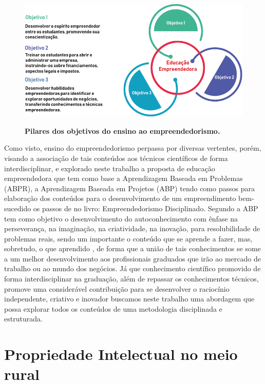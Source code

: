 \begin{figure}[!htb]
\centering
\caption{\textbf{Pilares dos objetivos do ensino ao empreendedorismo.}}
\includegraphics[scale=0.8]{Imagens/figura2.png}
\label{figura_3}
\end{figure}


Como visto, ensino do empreendedorismo perpassa por diversas vertentes, porém, visando a associação de tais conteúdos aos técnicos científicos de forma interdisciplinar, e explorado neste trabalho a proposta de educação empreendedora que tem como base a Aprendizagem Baseada em Problemas (ABPR), a Aprendizagem Baseada em Projetos (ABP) \cite{bender_aprendizagem_2015} tendo como passos para elaboração dos conteúdos para o desenvolvimento de um empreendimento bem-sucedido os passos de \cite{aulet_empreendedorismo_2019} no livro: Empreendedorismo Disciplinado. 
Segundo \cite{bender_aprendizagem_2015} a ABP tem como objetivo o desenvolvimento do autoconhecimento com ênfase na perseverança, na imaginação, na criatividade, na inovação, para resolubilidade de problemas reais, sendo um importante o conteúdo que se aprende a fazer, mas, sobretudo, o que aprendido \cite{souza_disseminacao_2001}, de forma que a união de tais conhecimentos se some a um melhor desenvolvimento aos profissionais graduados que irão ao mercado de trabalho ou ao mundo dos negócios. Já que conhecimento científico promovido de forma interdisciplinar na graduação, além de repassar os conhecimentos técnicos, promove  uma considerável contribuição para se desenvolver o raciocínio independente, criativo e inovador buscamos neste trabalho uma abordagem que possa explorar todos os conteúdos de uma metodologia disciplinada e estruturada.


\section{Propriedade Intelectual no meio rural}

